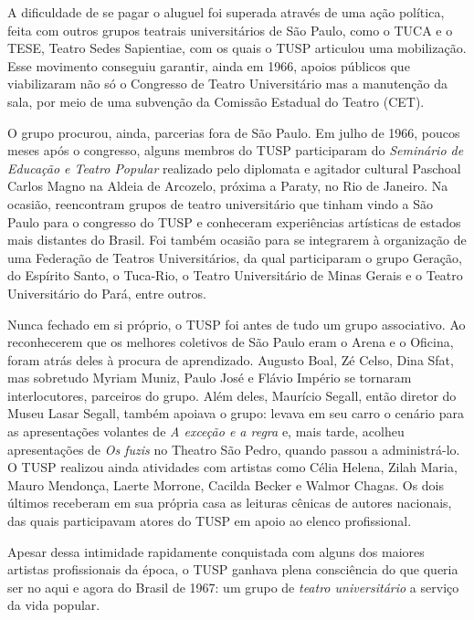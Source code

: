 A dificuldade de se pagar o aluguel foi superada através de uma ação
política, feita com outros grupos teatrais universitários de São Paulo,
como o TUCA e o TESE, Teatro Sedes Sapientiae, com os quais o TUSP
articulou uma mobilização. Esse movimento conseguiu garantir, ainda em
1966, apoios públicos que viabilizaram não só o Congresso de Teatro
Universitário mas a manutenção da sala, por meio de uma subvenção da
Comissão Estadual do Teatro (CET).

O grupo procurou, ainda, parcerias fora de São Paulo. Em julho de 1966,
poucos meses após o congresso, alguns membros do TUSP participaram do
\textit{Seminário de Educação e Teatro Popular} realizado pelo diplomata e
agitador cultural Paschoal Carlos Magno na Aldeia de Arcozelo, próxima a
Paraty, no Rio de Janeiro. Na ocasião, reencontram grupos de teatro
universitário que tinham vindo a São Paulo para o congresso do TUSP e
conheceram experiências artísticas de estados mais distantes do Brasil.
Foi também ocasião para se integrarem à organização de uma Federação de
Teatros Universitários, da qual participaram o grupo Geração, do
Espírito Santo, o Tuca-Rio, o Teatro Universitário de Minas Gerais e o
Teatro Universitário do Pará, entre outros.

Nunca fechado em si próprio, o TUSP foi antes de tudo um grupo
associativo. Ao reconhecerem que os melhores coletivos de São Paulo eram
o Arena e o Oficina, foram atrás deles à procura de aprendizado. Augusto
Boal, Zé Celso, Dina Sfat, mas sobretudo Myriam Muniz, Paulo José e
Flávio Império se tornaram interlocutores, parceiros do grupo. Além
deles, Maurício Segall, então diretor do Museu Lasar Segall, também
apoiava o grupo: levava em seu carro o cenário para as apresentações
volantes de \textit{A exceção e a regra} e, mais tarde, acolheu
apresentações de \textit{Os fuzis} no Theatro São Pedro, quando passou a
administrá-lo. O TUSP realizou ainda atividades com artistas como Célia
Helena, Zilah Maria, Mauro Mendonça, Laerte Morrone, Cacilda Becker e
Walmor Chagas. Os dois últimos receberam em sua própria casa as leituras
cênicas de autores nacionais, das quais participavam atores do TUSP em
apoio ao elenco profissional.

Apesar dessa intimidade rapidamente conquistada com alguns dos maiores
artistas profissionais da época, o TUSP ganhava plena consciência do que
queria ser no aqui e agora do Brasil de 1967: um grupo de \textit{teatro
universitário} a serviço da vida popular.


